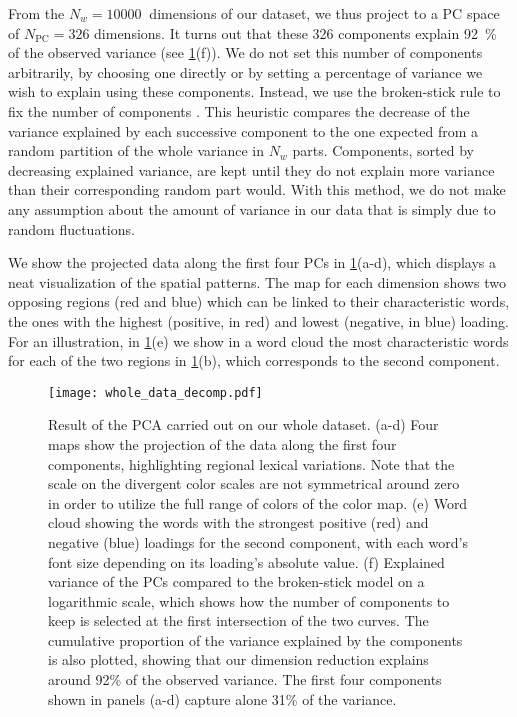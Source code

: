 \documentclass[../thesis.tex]{subfiles}
\begin{document}
From the $N_w = \SI{10000}{}$ dimensions of our dataset, we thus project to a \ac{PC}
space of $N_{\text{PC}} = 326$ dimensions. It turns out that these 326 components
explain 92~\% of the observed variance (see \cref{fig:whole_data_decomp}(f)). We do not
set this number of components arbitrarily, by choosing one directly or by setting a
percentage of variance we wish to explain using these components. Instead, we use the
broken-stick rule to fix the number of components
\cite{FrontierEtudeDecroissance1976,JacksonStoppingRules1993}. This heuristic compares
the decrease of the variance explained by each successive component to the one expected
from a random partition of the whole variance in $N_w$ parts. Components, sorted by
decreasing explained variance, are kept until they do not explain more variance than
their corresponding random part would. With this method, we do not make any assumption
about the amount of variance in our data that is simply due to random fluctuations.

We show the projected data along the first four \acp{PC} in
\cref{fig:whole_data_decomp}(a-d), which displays a neat visualization of the spatial
patterns. The map for each dimension shows two opposing regions (red and blue) which can
be linked to their characteristic words, the ones with the highest (positive, in red)
and lowest (negative, in blue) loading. For an illustration, in
\cref{fig:whole_data_decomp}(e) we show in a word cloud the most characteristic words
for each of the two regions in \cref{fig:whole_data_decomp}(b), which corresponds to the
second component.

\begin{figure}[ht!]
\centering
  \texttt{[image: whole\_data\_decomp.pdf]}
  \caption{Result of the \ac{PCA} carried out on our whole dataset. (a-d) Four maps show
  the projection of the data along the first four components, highlighting regional
  lexical variations. Note that the scale on the divergent color scales are not
  symmetrical around zero in order to utilize the full range of colors of the color map.
  (e) Word cloud showing the words with the strongest positive (red) and negative (blue)
  loadings for the second component, with each word's font size depending on its
  loading's absolute value. (f) Explained variance of the \acp{PC} compared to the
  broken-stick model on a logarithmic scale, which shows how the number of components to
  keep is selected at the first intersection of the two curves. The cumulative
  proportion of the variance explained by the components is also plotted, showing that
  our dimension reduction explains around 92\% of the observed variance. The first four
  components shown in panels (a-d) capture alone 31\% of the variance.}
  \label{fig:whole_data_decomp}
\end{figure}
\end{document}
